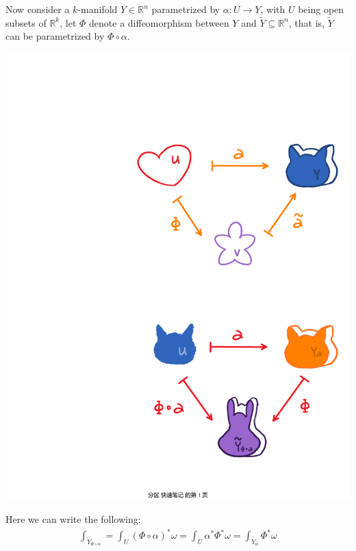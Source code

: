 \documentclass[11pt,oneside]{book}
\theoremstyle{break}
\theoremstyle{break}
\newcommand{\R}{\mathbb{R}}
\newcommand{\that}[1]{\widetilde{#1}}
\begin{document}
Now consider a $k$-manifold $Y \in \R^n$ parametrized by $\alpha:U \to Y$, with $U$ being open subsets of $\R^k$, let $\Phi$ denote a diffeomorphism between $Y$ and $\that{Y} \subseteq \R^n$, that is, $\that{Y}$ can be parametrized by $\Phi \circ \alpha$. 
\begin{center}
\includegraphics[scale=0.5]{Intkform1.pdf}
\end{center}

Here we can write the following:
\begin{align*}
\int_{\that{Y}_{\Phi \circ \alpha}} = \int_U (\Phi\circ \alpha)^*\omega = \int_U \alpha^*\Phi^*\omega = \int_{Y_\alpha} \Phi^*\omega
\end{align*}


\newpage
\end{document}
